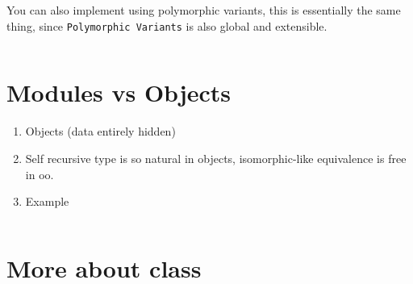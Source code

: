 You can also implement using polymorphic variants, this is essentially
the same thing, since \verb|Polymorphic Variants| is also global and
extensible.


\inputminted[fontsize=\scriptsize, fontsize=\scriptsize, ]{ocaml}{oo/code/downcast2.ml}



\section{Modules vs Objects}

\begin{enumerate}
\item Objects (data entirely hidden)
\item Self recursive type is so natural in objects, isomorphic-like
  equivalence is free in oo.
\item Example

\inputminted[fontsize=\scriptsize, fontsize=\scriptsize, ]{ocaml}{oo/code/obj_module.ml}
\end{enumerate}


\section{More about class}
